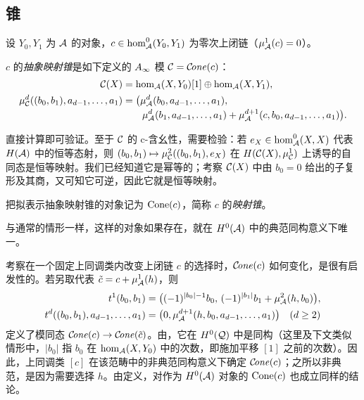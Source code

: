 \subsection{锥}\label{sec:3e}
设 $Y_0,Y_1$ 为 $\mathcal A$ 的对象，$c\in\hom^0_{\mathcal A}(Y_0,Y_1)$ 为零次上闭链（$\mu^1_{\mathcal A}(c)=0$）。
\begin{definition*}
$c$ 的\emph{抽象映射锥}是如下定义的 $A_\infty$ 模 $\mathcal C=\mathcal C\!\mathit{one}(c)$：
\begin{equation}\label{eq:3.6}
\begin{aligned}
\mathcal C(X)&=\hom_{\mathcal A}(X,Y_0)[1]\oplus\hom_{\mathcal A}(X,Y_1),\\
\mu^d_{\mathcal C}((b_0,b_1),a_{d-1},\ldots,a_1)
&=\bigl(\mu^d_{\mathcal A}(b_0,a_{d-1},\ldots,a_1),\\[-2pt]
&\qquad\mu^d_{\mathcal A}(b_1,a_{d-1},\ldots,a_1)+\mu^{d+1}_{\mathcal A}(c,b_0,a_{d-1},\ldots,a_1)\bigr).
\end{aligned}
\end{equation}

\end{definition*}
直接计算即可验证。至于 $\mathcal C$ 的 c-含幺性，需要检验：若 $e_X\in\hom^0_{\mathcal A}(X,X)$ 代表 $H(\mathcal A)$ 中的恒等态射，则 $(b_0,b_1)\mapsto\mu^2_{\mathcal C}((b_0,b_1),e_X)$ 在 $H(\mathcal C(X),\mu^1_{\mathcal C})$ 上诱导的自同态是恒等映射。我们已经知道它是幂等的；考察 $\mathcal C(X)$ 中由 $b_0=0$ 给出的子复形及其商，又可知它可逆，因此它就是恒等映射。
\begin{definition*}
把拟表示抽象映射锥的对象记为 $\operatorname{Cone}(c)$，简称 $c$ 的\emph{映射锥}。
\end{definition*}
与通常的情形一样，这样的对象如果存在，就在 $H^0(\mathcal A)$ 中的典范同构意义下唯一。

考察在一个固定上同调类内改变上闭链 $c$ 的选择时，$\mathcal C\!\mathit{one}(c)$ 如何变化，是很有启发性的。若另取代表 $\tilde c=c+\mu^1_{\mathcal A}(h)$，则
\begin{equation}\label{eq:3.7}
\begin{aligned}
t^1(b_0,b_1)&=\bigl((-1)^{|b_0|-1}b_0,\,(-1)^{|b_1|}b_1+\mu^2_{\mathcal A}(h,b_0)\bigr),\\
t^d((b_0,b_1),a_{d-1},\ldots,a_1)&=\bigl(0,\mu^{d+1}_{\mathcal A}(h,b_0,a_{d-1},\ldots,a_1)\bigr)\quad(d\geq2)
\end{aligned}
\end{equation}
定义了模同态 $\mathcal C\!\mathit{one}(c)\to\mathcal C\!\mathit{one}(\tilde c)$。由，它在 $H^0(\mathcal Q)$ 中是同构（这里及下文类似情形中，$|b_0|$ 指 $b_0$ 在 $\hom_{\mathcal A}(X,Y_0)$ 中的次数，即施加平移 $[1]$ 之前的次数）。因此，上同调类 $[c]$ 在该范畴中的非典范同构意义下确定 $\mathcal C\!\mathit{one}(c)$；之所以非典范，是因为需要选择 $h$。由定义，对作为 $H^0(\mathcal A)$ 对象的 $\operatorname{Cone}(c)$ 也成立同样的结论。

